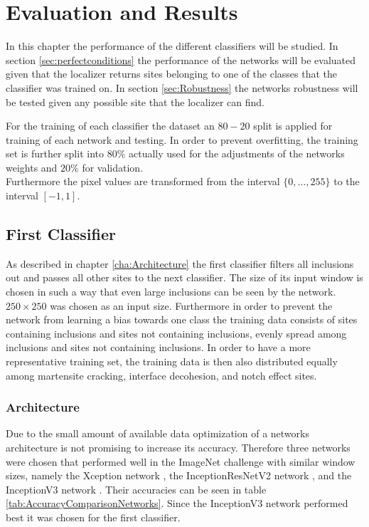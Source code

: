 
\chapter{Evaluation and Results} %

\label{Performance} %

In this chapter the performance of the different classifiers will be studied. In section \ref{sec:perfectconditions} the performance of the networks will be evaluated given that the localizer returns sites belonging to one of the classes that the classifier was trained on. In section \ref{sec:Robustness} the networks robustness will be tested given any possible site that the localizer can find. 

For the training of each classifier the dataset an $80-20$ split is applied for training of each network and testing. In order to prevent overfitting, the training set is further split into $80\%$ actually used for the adjustments of the networks weights and $20\%$ for validation. \\
Furthermore the pixel values are transformed from the interval $\{0,\dots,255\}$ to the interval $[-1,1]$.\\


\newpage
\section{First Classifier}

As described in chapter \ref{cha:Architecture} the first classifier filters all inclusions out and passes all other sites to the next classifier. The size of its input window is chosen in such a way that even large inclusions can be seen by the network. $250\times 250$ was chosen as an input size. Furthermore in order to prevent the network from learning a bias towards one class the training data consists of sites containing inclusions and sites not containing inclusions, evenly spread among inclusions and sites not containing inclusions. In order to have a more representative training set, the training data is then also distributed equally among martensite cracking, interface decohesion, and notch effect sites.

\subsection{Architecture}
Due to the small amount of available data optimization of a networks architecture is not promising to increase its accuracy. Therefore three networks were chosen that performed well in the ImageNet challenge with similar window sizes, namely the Xception network \cite{Xception}, the InceptionResNetV2 network \cite{InceptionResNetV2}, and the InceptionV3 network \cite{InceptionV3}. Their accuracies can be seen in table \ref{tab:AccuracyComparisonNetworks}. Since the InceptionV3 network performed best it was chosen for the first classifier.\\


